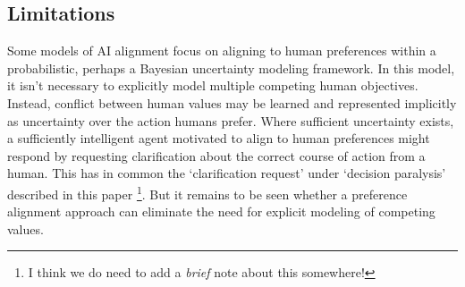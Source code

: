 \subsection{Limitations}

Some models of AI alignment focus on \cite{russell2019human} aligning to human preferences within a probabilistic, perhaps a Bayesian uncertainty modeling framework.  In this model, it isn't necessary to explicitly model multiple competing human objectives. Instead, conflict between human values may be learned and represented implicitly as uncertainty over the action humans prefer. Where sufficient uncertainty exists, a sufficiently intelligent agent motivated to align to human preferences might respond by requesting clarification about the correct course of action from a human. This has in common the `clarification request' under `decision paralysis' described in this paper \footnote{I think we do need to add a \textit{brief} note about this somewhere!}. But it remains to be seen whether a preference alignment approach can eliminate the need for explicit modeling of competing values.